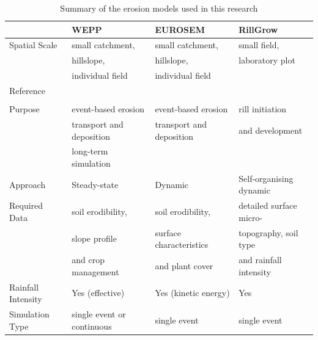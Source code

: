 \begin{table}
  \centering
  \caption{Summary of the erosion models used in this research}
  \label{tab:ModelsUsedInThePresentStudy}
    \begin{tabular}{llll}
\toprule
    & WEPP      & EUROSEM   & RillGrow\\
\midrule
Spatial Scale & small catchment,  & small catchment,  & small field,\\
    & hillslope,    & hillslope,  & laboratory plot\\
    & individual field  & individual field  & \\
\midrule
      Reference & \citealp{nearing1989-1587} &
\citealp{morgan1998-389} & \citealp{favis1998-353}\\
                & \citealp{flanagan1995-usda} & & \\
      \midrule
      Purpose  & event-based erosion & event-based erosion &
rill initiation\\
               & transport and deposition & transport and
deposition & and development\\
               & long-term simulation & & \\
      \midrule
      Approach & Steady-state & Dynamic & Self-organising dynamic\\
      \midrule
      Required Data & soil erodibility, & soil erodibility, &
detailed surface micro-\\
                    & slope profile & surface characteristics
& topography, soil type \\
                    & and crop management   & and plant cover
& and rainfall intensity  \\
      \midrule
      Rainfall Intensity & Yes (effective) & Yes (kinetic energy) & Yes \\
      \midrule
      Simulation Type & single event or continuous & single
event & single event\\
      \bottomrule
    \end{tabular}
\end{table}

